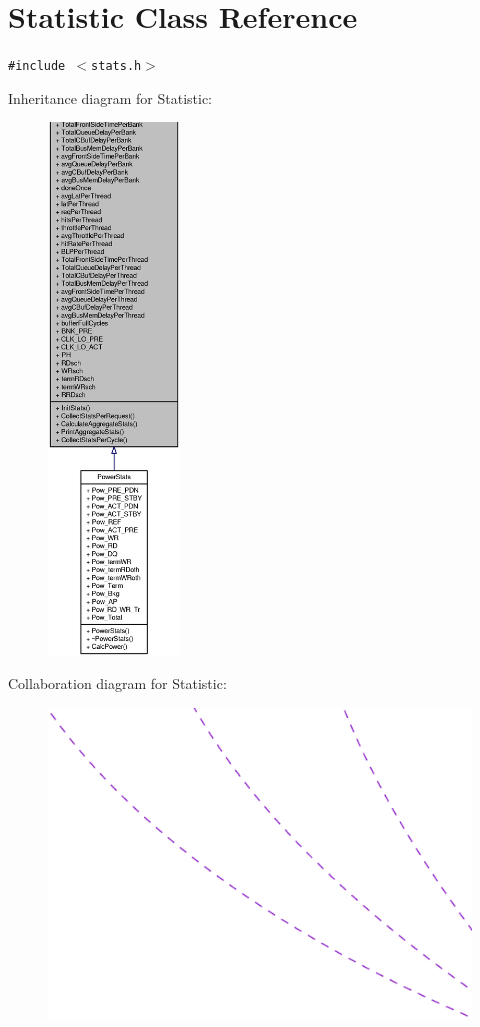 \section{Statistic Class Reference}
\label{classStatistic}
{\tt \#include $<$stats.h$>$}

Inheritance diagram for Statistic:\nopagebreak
\begin{figure}[H]
\begin{center}
\leavevmode
\includegraphics[height=400pt]{classStatistic__inherit__graph}
\end{center}
\end{figure}
Collaboration diagram for Statistic:\nopagebreak
\begin{figure}[H]
\begin{center}
\leavevmode
\includegraphics[width=400pt]{classStatistic__coll__graph}
\end{center}
\end{figure}
